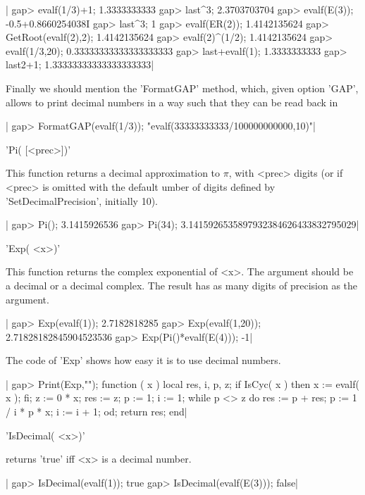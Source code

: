 |    gap> evalf(1/3)+1;
    1.3333333333
    gap> last^3;
    2.3703703704
    gap> evalf(E(3));
    -0.5+0.8660254038I
    gap> last^3;
    1
    gap> evalf(ER(2));
    1.4142135624
    gap> GetRoot(evalf(2),2);
    1.4142135624
    gap> evalf(2)^(1/2);
    1.4142135624
    gap> evalf(1/3,20);
    0.33333333333333333333
    gap> last+evalf(1);
    1.3333333333
    gap> last2+1;
    1.33333333333333333333|

Finally  we should mention the 'FormatGAP'  method, which, given option 'GAP',
allows  to print decimal numbers in  a way such that they  can be read back in
\GAP\:\

|    gap> FormatGAP(evalf(1/3));
    "evalf(33333333333/100000000000,10)"|

%
%

'Pi( [<prec>])'

This function  returns a  decimal approximation  to $\pi$,  with <prec>
digits  (or if  <prec>  is omitted  with the  default  umber of  digits
defined by 'SetDecimalPrecision', initially 10).

|    gap> Pi();
    3.1415926536
    gap> Pi(34);
    3.1415926535897932384626433832795029|

%
%

'Exp( <x>)'

This  function returns  the complex  exponential of  <x>. The  argument
should be a decimal or a decimal complex. The result has as many digits
of precision as the argument.

|    gap> Exp(evalf(1));
    2.7182818285
    gap> Exp(evalf(1,20));
    2.71828182845904523536
    gap> Exp(Pi()*evalf(E(4)));
    -1|

The code of 'Exp' shows how easy it is to use decimal numbers.

|    gap> Print(Exp,"\n");
    function ( x )
        local  res, i, p, z;
        if IsCyc( x )  then
            x := evalf( x );
        fi;
        z := 0 * x;
        res := z;
        p := 1;
        i := 1;
        while p <> z  do
            res := p + res;
            p := 1 / i * p * x;
            i := i + 1;
        od;
        return res;
    end|

%
%

'IsDecimal( <x>)'

returns 'true' iff <x> is a decimal number.

|    gap> IsDecimal(evalf(1));
    true
    gap> IsDecimal(evalf(E(3)));
    false|

